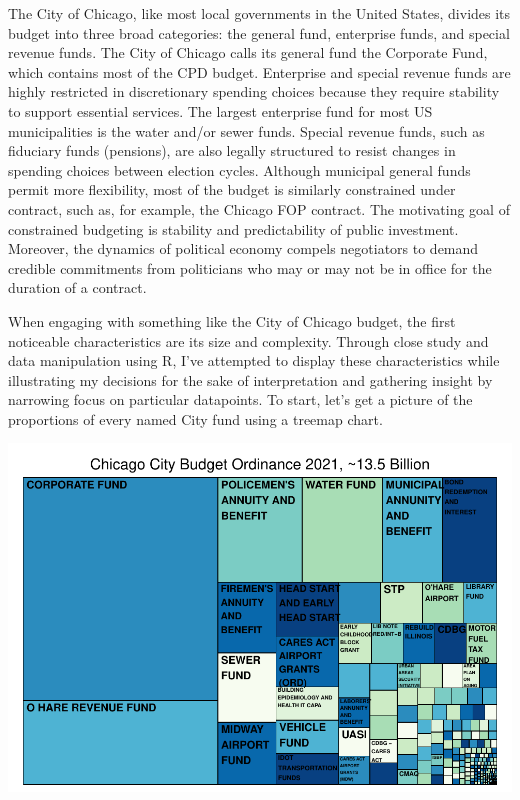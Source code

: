 \documentclass[
]{article}
\begin{document}
The City of Chicago, like most local governments in the United States,
divides its budget into three broad categories: the general fund,
enterprise funds, and special revenue funds. The City of Chicago calls
its general fund the Corporate Fund, which contains most of the CPD
budget. Enterprise and special revenue funds are highly restricted in
discretionary spending choices because they require stability to support
essential services. The largest enterprise fund for most US
municipalities is the water and/or sewer funds. Special revenue funds,
such as fiduciary funds (pensions), are also legally structured to
resist changes in spending choices between election cycles. Although
municipal general funds permit more flexibility, most of the budget is
similarly constrained under contract, such as, for example, the Chicago
FOP contract. The motivating goal of constrained budgeting is stability
and predictability of public investment. Moreover, the dynamics of
political economy compels negotiators to demand credible commitments
from politicians who may or may not be in office for the duration of a
contract.

When engaging with something like the City of Chicago budget, the first
noticeable characteristics are its size and complexity. Through close
study and data manipulation using R, I've attempted to display these
characteristics while illustrating my decisions for the sake of
interpretation and gathering insight by narrowing focus on particular
datapoints. To start, let's get a picture of the proportions of every
named City fund using a treemap chart.

\begin{center}\includegraphics{cpd_budget_analysis_files/figure-latex/full budget treemap-1} \end{center}
\end{document}
